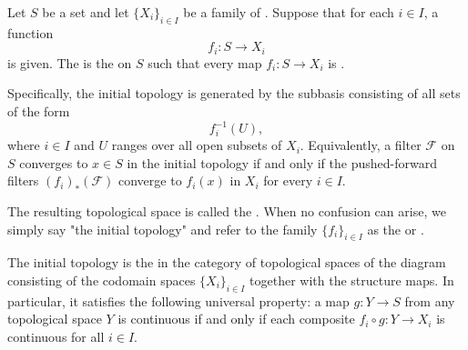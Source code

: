 \begin{definition} \label{definition:initial_topology_on_a_set_with_respect_to_a_family_of_functions}
    Let $S$ be a set and let $\{X_i\}_{i \in I}$ be a family of . Suppose that for each $i \in I$, a function
    $$f_i : S \to X_i$$
    is given. The  is the  on $S$ such that every map $f_i : S \to X_i$ is .

    Specifically, the initial topology is generated by the subbasis consisting of all sets of the form
    $$f_i^{-1}(U),$$
    where $i \in I$ and $U$ ranges over all open subsets of $X_i$. Equivalently, a filter $\mathcal{F}$ on $S$ converges to $x \in S$ in the initial topology if and only if the pushed-forward filters $(f_i)_*(\mathcal{F})$ converge to $f_i(x)$ in $X_i$ for every $i \in I$.

    The resulting topological space is called the . When no confusion can arise, we simply say "the initial topology" and refer to the family $\{f_i\}_{i \in I}$ as the  or .

    The initial topology is the  in the category of topological spaces of the diagram consisting of the codomain spaces $\{X_i\}_{i \in I}$ together with the structure maps. In particular, it satisfies the following universal property: a map $g : Y \to S$ from any topological space $Y$ is continuous if and only if each composite $f_i \circ g : Y \to X_i$ is continuous for all $i \in I$.
\end{definition}
